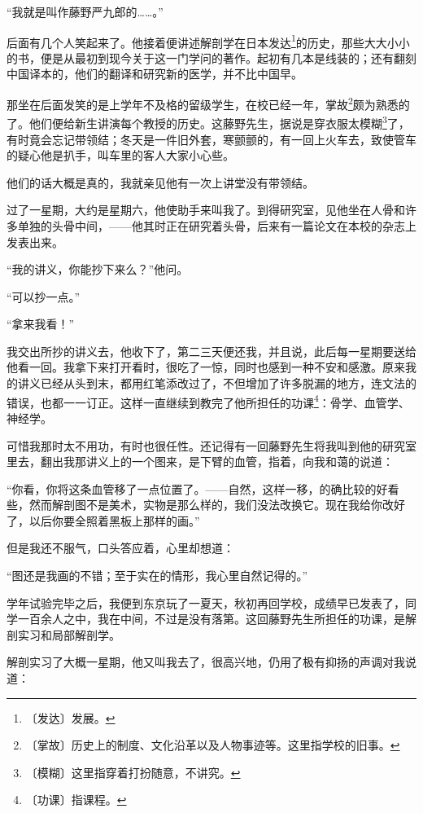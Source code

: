 \documentclass[12pt,UTF-8,openany]{ctexbook}
\begin{document}
\begin{normalsize}
    “我就是叫作藤野严九郎的……。”
    
    后面有几个人笑起来了。他接着便讲述解剖学在日本发达\footnote{〔发达〕发展。}的历史，那些大大小小的书，便是从最初到现今关于这一门学问的著作。起初有几本是线装的；还有翻刻中国译本的，他们的翻译和研究新的医学，并不比中国早。
    
    那坐在后面发笑的是上学年不及格的留级学生，在校已经一年，掌故\footnote{〔掌故〕历史上的制度、文化沿革以及人物事迹等。这里指学校的旧事。}颇为熟悉的了。他们便给新生讲演每个教授的历史。这藤野先生，据说是穿衣服太模糊\footnote{〔模糊〕这里指穿着打扮随意，不讲究。}了，有时竟会忘记带领结；冬天是一件旧外套，寒颤颤的，有一回上火车去，致使管车的疑心他是扒手，叫车里的客人大家小心些。
    
    他们的话大概是真的，我就亲见他有一次上讲堂没有带领结。
    
    过了一星期，大约是星期六，他使助手来叫我了。到得研究室，见他坐在人骨和许多单独的头骨中间，——他其时正在研究着头骨，后来有一篇论文在本校的杂志上发表出来。
    
    “我的讲义，你能抄下来么？”他问。
    
    “可以抄一点。”
    
    “拿来我看！”
    
    我交出所抄的讲义去，他收下了，第二三天便还我，并且说，此后每一星期要送给他看一回。我拿下来打开看时，很吃了一惊，同时也感到一种不安和感激。原来我的讲义已经从头到末，都用红笔添改过了，不但增加了许多脱漏的地方，连文法的错误，也都一一订正。这样一直继续到教完了他所担任的功课\footnote{〔功课〕指课程。}：骨学、血管学、神经学。
    
    可惜我那时太不用功，有时也很任性。还记得有一回藤野先生将我叫到他的研究室里去，翻出我那讲义上的一个图来，是下臂的血管，指着，向我和蔼的说道：
    
    “你看，你将这条血管移了一点位置了。——自然，这样一移，的确比较的好看些，然而解剖图不是美术，实物是那么样的，我们没法改换它。现在我给你改好了，以后你要全照着黑板上那样的画。”
    
    但是我还不服气，口头答应着，心里却想道：
    
    “图还是我画的不错；至于实在的情形，我心里自然记得的。”
    
    学年试验完毕之后，我便到东京玩了一夏天，秋初再回学校，成绩早已发表了，同学一百余人之中，我在中间，不过是没有落第。这回藤野先生所担任的功课，是解剖实习和局部解剖学。
    
    解剖实习了大概一星期，他又叫我去了，很高兴地，仍用了极有抑扬的声调对我说道：
    

\end{normalsize}
\end{document}
